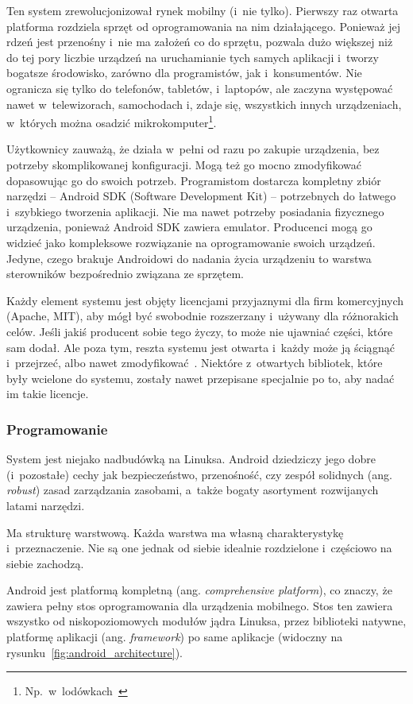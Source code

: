 Ten system zrewolucjonizował rynek mobilny (i~nie tylko). Pierwszy raz otwarta platforma rozdziela sprzęt od oprogramowania na nim działającego. Ponieważ jej rdzeń jest przenośny i~nie ma założeń co do sprzętu, pozwala dużo większej niż do tej pory liczbie urządzeń na uruchamianie tych samych aplikacji i~tworzy bogatsze środowisko, zarówno dla programistów, jak i~konsumentów. Nie ogranicza się tylko do telefonów, tabletów, i~laptopów, ale zaczyna występować nawet w~telewizorach, samochodach i, zdaje się, wszystkich innych urządzeniach, w~których można osadzić mikrokomputer\footnote{Np.\ w~lodówkach~\cite{android-fridge}}.

Użytkownicy zauważą, że działa w~pełni od razu po zakupie urządzenia, bez potrzeby skomplikowanej konfiguracji. Mogą też go mocno zmodyfikować dopasowując go do swoich potrzeb.
Programistom dostarcza kompletny zbiór narzędzi -- Android SDK (Software Development Kit) -- potrzebnych do łatwego i~szybkiego tworzenia aplikacji. Nie ma nawet potrzeby posiadania fizycznego urządzenia, ponieważ Android SDK zawiera emulator.
Producenci mogą go widzieć jako kompleksowe rozwiązanie na oprogramowanie swoich urządzeń. Jedyne, czego brakuje Androidowi do nadania życia urządzeniu to warstwa sterowników bezpośrednio związana ze sprzętem.

Każdy element systemu jest objęty licencjami przyjaznymi dla firm komercyjnych (Apache, MIT), aby mógł być swobodnie rozszerzany i~używany dla różnorakich celów.
Jeśli jakiś producent sobie tego życzy, to może nie ujawniać części, które sam dodał. Ale poza tym, reszta systemu jest otwarta i~każdy może ją ściągnąć i~przejrzeć, albo nawet zmodyfikować~\cite{android-building}.
Niektóre z~otwartych bibliotek, które były wcielone do systemu, zostały nawet przepisane specjalnie po to, aby nadać im takie licencje.

\subsubsection{Programowanie}
System jest niejako nadbudówką na Linuksa. Android dziedziczy jego dobre (i~pozostałe) cechy jak bezpieczeństwo, przenośność, czy zespół solidnych (ang. \emph{robust}) zasad zarządzania zasobami, a~także bogaty asortyment rozwijanych latami narzędzi.

Ma strukturę warstwową. Każda warstwa ma własną charakterystykę i~przeznaczenie. Nie są one jednak od siebie idealnie rozdzielone i~częściowo na siebie zachodzą.

Android jest platformą kompletną (ang. \emph{comprehensive platform}), co znaczy, że zawiera pełny stos oprogramowania dla urządzenia mobilnego. Stos ten zawiera wszystko od niskopoziomowych modułów jądra Linuksa, przez biblioteki natywne, platformę aplikacji (ang. \emph{framework}) po same aplikacje (widoczny na rysunku~\ref{fig:android_architecture}).

